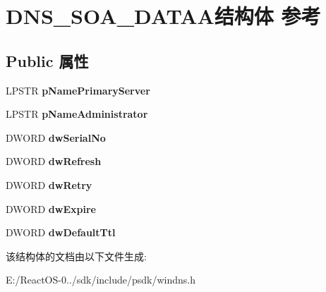 \hypertarget{struct_d_n_s___s_o_a___d_a_t_a_a}{}\section{D\+N\+S\+\_\+\+S\+O\+A\+\_\+\+D\+A\+T\+A\+A结构体 参考}
\label{struct_d_n_s___s_o_a___d_a_t_a_a}
\subsection*{Public 属性}
\begin{DoxyCompactItemize}
\item 
\mbox{\label{struct_d_n_s___s_o_a___d_a_t_a_a_a54750cd87fe4de6756e4d81fefa34c2d}} 
L\+P\+S\+TR {\bfseries p\+Name\+Primary\+Server}
\item 
\mbox{\label{struct_d_n_s___s_o_a___d_a_t_a_a_ae5d47a0f170f40ddc8c58855111cfa86}} 
L\+P\+S\+TR {\bfseries p\+Name\+Administrator}
\item 
\mbox{\label{struct_d_n_s___s_o_a___d_a_t_a_a_a12ee6bae91118dc8eec911791bccc629}} 
D\+W\+O\+RD {\bfseries dw\+Serial\+No}
\item 
\mbox{\label{struct_d_n_s___s_o_a___d_a_t_a_a_af0258c12517446ee8ba171ed441e6664}} 
D\+W\+O\+RD {\bfseries dw\+Refresh}
\item 
\mbox{\label{struct_d_n_s___s_o_a___d_a_t_a_a_ab533b9bbd4e623b469840d760f451774}} 
D\+W\+O\+RD {\bfseries dw\+Retry}
\item 
\mbox{\label{struct_d_n_s___s_o_a___d_a_t_a_a_a7ba92c929ab4fc7cd8460b3672539ab6}} 
D\+W\+O\+RD {\bfseries dw\+Expire}
\item 
\mbox{\label{struct_d_n_s___s_o_a___d_a_t_a_a_a423ddd5122eec9bbd4183d61320054bc}} 
D\+W\+O\+RD {\bfseries dw\+Default\+Ttl}
\end{DoxyCompactItemize}


该结构体的文档由以下文件生成\+:\begin{DoxyCompactItemize}
\item 
E\+:/\+React\+O\+S-\/0../sdk/include/psdk/windns.\+h\end{DoxyCompactItemize}
